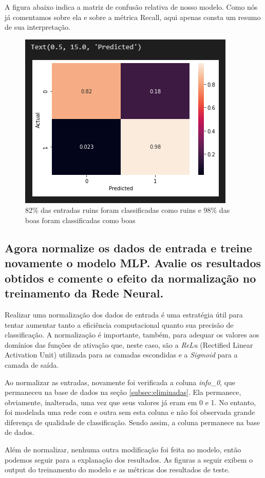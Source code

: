 \documentclass[12pt]{article}
\begin{document}
A figura abaixo indica a matriz de confusão relativa de nosso modelo. Como nós já comentamos sobre ela e sobre a métrica Recall, aqui apenas consta um resumo de sua interpretação.
\begin{figure}[H]
	\centering
	\includegraphics[width=0.5\linewidth]{Imagens/ConfusionMatrizNaoNormalizado}
	\caption{82\% das entradas ruins foram classificadas como ruins e 98\% das boas foram classificadas como boas}
	\label{fig:confusionmatriznaonormalizado}
\end{figure}




\subsection{Agora normalize os dados de entrada e treine novamente o modelo MLP.	Avalie os resultados obtidos e comente o efeito da normalização no	treinamento da Rede Neural.}\label{subsec:normalizada}
	
Realizar uma normalização dos dados de entrada é uma estratégia útil para tentar aumentar tanto a eficiência computacional quanto sua precisão de classificação. A normalização é importante, também, para adequar os valores aos domínios das funções de ativação que, neste caso, são a \textit{ReLu} (Rectified Linear Activation Unit) utilizada para as camadas escondidas e a \textit{Sigmoid} para a camada de saída.

Ao normalizar as entradas, novamente foi verificada a coluna \textit{info\_0}, que permaneceu na base de dados na seção \ref{subsec:eliminadas}. Ela permanece, obviamente, inalterada, uma vez que seus valores já eram em 0 e 1. No entanto, foi modelada uma rede com e outra sem esta coluna e não foi observada grande diferença de qualidade de classificação. Sendo assim, a coluna permanece na base de dados.

Além de normalizar, nenhuma outra modificação foi feita no modelo, então podemos seguir para a explanação dos resultados. As figuras a seguir exibem o output do treinamento do modelo e as métricas dos resultados de teste.
\end{document}
